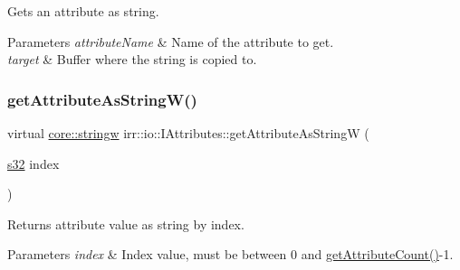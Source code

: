 Gets an attribute as string. 


\begin{DoxyParams}{Parameters}
{\em attribute\+Name} & Name of the attribute to get. \\
\hline
{\em target} & Buffer where the string is copied to. \\
\hline
\end{DoxyParams}
\mbox{\label{classirr_1_1io_1_1IAttributes_a60ab65d3d3e123af2b2d47b1bd48f771}} 
\subsubsection{\texorpdfstring{get\+Attribute\+As\+String\+W()}{getAttributeAsStringW()}\hspace{0.1cm}{\footnotesize\ttfamily [5/6]}}
{\footnotesize\ttfamily virtual \hyperlink{namespaceirr_1_1core_a5aedb62cb47cf01d1c548ab5e6344d2d}{core\+::stringw} irr\+::io\+::\+I\+Attributes\+::get\+Attribute\+As\+StringW (\begin{DoxyParamCaption}\item[{\hyperlink{namespaceirr_ac66849b7a6ed16e30ebede579f9b47c6}{s32}}]{index }\end{DoxyParamCaption})\hspace{0.3cm}{\ttfamily [pure virtual]}}



Returns attribute value as string by index. 


\begin{DoxyParams}{Parameters}
{\em index} & Index value, must be between 0 and \hyperlink{classirr_1_1io_1_1IAttributes_a796bdd9440ee7ba0b6742a90a82870b6}{get\+Attribute\+Count()}-\/1. \\
\hline
\end{DoxyParams}
\mbox{\label{classirr_1_1io_1_1IAttributes_a60ab65d3d3e123af2b2d47b1bd48f771}} 
